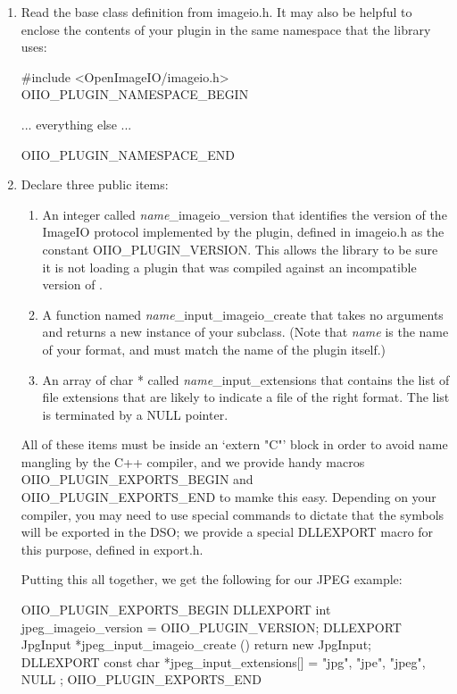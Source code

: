 \begin{enumerate}
\item Read the base class definition from {\fn imageio.h}.  It may also
  be helpful to enclose the contents of your plugin in the same
  namespace that the \product library uses:

  \begin{code}
    #include <OpenImageIO/imageio.h>
    OIIO_PLUGIN_NAMESPACE_BEGIN

    ... everything else ...

    OIIO_PLUGIN_NAMESPACE_END
  \end{code}

\item Declare three public items:

  \begin{enumerate}
    \item An integer called \emph{name}{\cf _imageio_version} that identifies
      the version of the ImageIO protocol implemented by the plugin,
      defined in {\fn imageio.h} as the constant {\cf OIIO_PLUGIN_VERSION}.
      This allows the library to be sure it is not loading a plugin
      that was compiled against an incompatible version of \product.
    \item A function named \emph{name}{\cf _input_imageio_create} that
      takes no arguments and returns a new instance of your \ImageInput
      subclass.  (Note that \emph{name} is the name of your format,
      and must match the name of the plugin itself.)
    \item An array of {\cf char *} called \emph{name}{\cf _input_extensions}
      that contains the list of file extensions that are likely to indicate
      a file of the right format.  The list is terminated by a {\cf NULL}
      pointer.
  \end{enumerate}

  All of these items must be inside an `{\cf extern "C"}' block in order
  to avoid name mangling by the C++ compiler, and we provide handy
  macros {\cf OIIO_PLUGIN_EXPORTS_BEGIN} and {\cf OIIO_PLUGIN_EXPORTS_END}
  to mamke this easy.  Depending on your
  compiler, you may need to use special commands to dictate that the
  symbols will be exported in the DSO; we provide a special {\cf
  DLLEXPORT} macro for this purpose, defined in {\fn export.h}.

  Putting this all together, we get the following for our JPEG example:

  \begin{code}
    OIIO_PLUGIN_EXPORTS_BEGIN
        DLLEXPORT int jpeg_imageio_version = OIIO_PLUGIN_VERSION;
        DLLEXPORT JpgInput *jpeg_input_imageio_create () {
            return new JpgInput;
        }
        DLLEXPORT const char *jpeg_input_extensions[] = {
            "jpg", "jpe", "jpeg", NULL
        };
    OIIO_PLUGIN_EXPORTS_END
  \end{code}


\end{enumerate}
